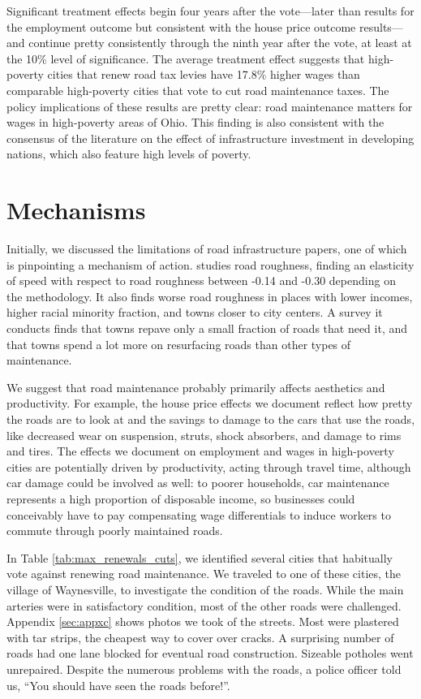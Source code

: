 Significant treatment effects begin four years after the vote—later than results for the employment outcome but consistent with the house price outcome results—and continue pretty consistently through the ninth year after the vote, at least at the 10\% level of significance.  The average treatment effect suggests that high-poverty cities that renew road tax levies have 17.8\% higher wages than comparable high-poverty cities that vote to cut road maintenance taxes.  The policy implications of these results are pretty clear: road maintenance matters for wages in high-poverty areas of Ohio.  This finding is also consistent with the consensus of the literature on the effect of infrastructure investment in developing nations, which also feature high levels of poverty.

\section{Mechanisms} \label{sec:mech}

Initially, we discussed the limitations of road infrastructure papers, one of which is pinpointing a mechanism of action. \cite{currier2023} studies road roughness, finding an elasticity of speed with respect to road roughness between -0.14 and -0.30 depending on the methodology.  It also finds worse road roughness in places with lower incomes, higher racial minority fraction, and towns closer to city centers. A survey it conducts finds that towns repave only a small fraction of roads that need it, and that towns spend a lot more on resurfacing roads than other types of maintenance.

We suggest that road maintenance probably primarily affects aesthetics and productivity.  For example, the house price effects we document reflect how pretty the roads are to look at and the savings to damage to the cars that use the roads, like decreased wear on suspension, struts, shock absorbers, and damage to rims and tires. The effects we document on employment and wages in high-poverty cities are potentially driven by productivity, acting through travel time, although car damage could be involved as well:  to poorer households, car maintenance represents a high proportion of disposable income, so businesses could conceivably have to pay compensating wage differentials to induce workers to commute through poorly maintained roads. 

In Table \ref{tab:max_renewals_cuts}, we identified several cities that habitually vote against renewing road maintenance.  We traveled to one of these cities, the village of Waynesville, to investigate the condition of the roads.  While the main arteries were in satisfactory condition, most of the other roads were challenged.  Appendix \ref{sec:appxc} shows photos we took of the streets. Most were plastered with tar strips, the cheapest way to cover over cracks.  A surprising number of roads had one lane blocked for eventual road construction.  Sizeable potholes went unrepaired.  Despite the numerous problems with the roads, a police officer told us, “You should have seen the roads before!”. 

